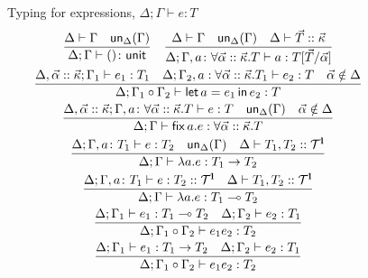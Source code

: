 \begin{figure}[t]
  Typing for expressions, $\Delta;\Gamma \vdash e: T$
  \begin{gather*}
    \frac{\Delta \vdash \Gamma \quad \mathsf{un}_\Delta(\Gamma)}{\Delta;\Gamma \vdash () \colon \mathsf{unit}}
    \quad
    \frac{
      \Delta \vdash \Gamma \quad
      \mathsf{un}_\Delta(\Gamma) \quad
      \Delta \vdash \vec T :: \vec {\kappa}
    }{
      \Delta;\Gamma,a\colon \forall \vec\alpha::\vec{\kappa}. T
      \vdash a : T[{\vec T}/{\vec \alpha}]}
    \\
    \frac{
      \Delta, \vec\alpha :: \vec{\kappa}; \Gamma_1 \vdash e_1 : T_1 \quad
      \Delta; \Gamma_2, a : \forall \vec\alpha::\vec{\kappa}. T_1 \vdash
      e_2 : T \quad
      \vec\alpha \notin \Delta
    }{
      \Delta;\Gamma_1\circ \Gamma_2 \vdash \mathsf{let}\,{a}={e_1}\,\mathsf{in}\,{e_2} : T
    }
    \\
    \frac{
        \Delta, \vec\alpha :: \vec{\kappa};\Gamma, a\colon  \forall
        \vec\alpha::\vec{\kappa}. T \vdash e : T  \quad
        \mathsf{un}_\Delta(\Gamma) \quad
        \vec\alpha \notin \Delta
    }{
      \Delta;\Gamma \vdash \mathsf{fix}\,{a}.{e} :  \forall \vec\alpha::\vec{\kappa} .T
    }
    \\
    \frac{
      \Delta;\Gamma,a\colon T_1 \vdash e : T_2
      \quad
      \mathsf{un}_\Delta(\Gamma)
      \quad
      \Delta \vdash T_1,T_2 ::\mathcal T^{\mathbf{l}}
    }{
      \Delta;\Gamma \vdash \lambda a.e : T_1 \rightarrow T_2
    }
    \\
    \frac{
      \Delta;\Gamma,a\colon T_1 \vdash e : T_2::\mathcal T^{\mathbf{l}}
      \quad
      \Delta \vdash T_1,T_2 ::\mathcal T^{\mathbf{l}}
    }{
      \Delta;\Gamma \vdash \lambda a.e : T_1 \multimap T_2
    }
    \\
    \frac{
      \Delta;\Gamma_1 \vdash e_1 : T_1 \multimap T_2 \quad \Delta;\Gamma_2
      \vdash e_2 : T_1
    }{
      \Delta;\Gamma_1\circ  \Gamma_2 \vdash e_1 e_2 : T_2
    }
     \\
    \frac{
      \Delta;\Gamma_1 \vdash e_1 : T_1 \rightarrow T_2 \quad \Delta;\Gamma_2
      \vdash e_2 : T_1
    }{
      \Delta;\Gamma_1\circ  \Gamma_2 \vdash e_1 e_2 : T_2
}
\end{gather*}
\end{figure}
